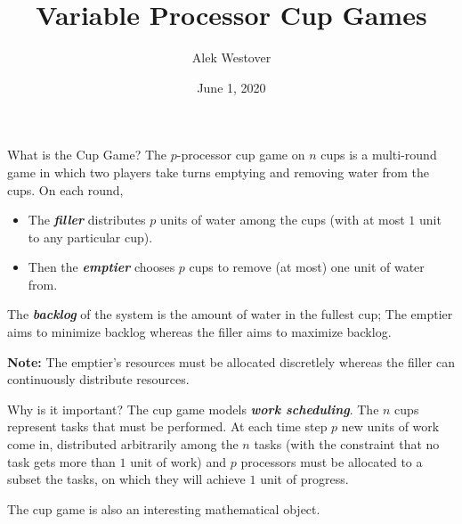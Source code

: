 \documentclass[xcolor=x11names, svgnames, rgb]{beamer}
\title{Variable Processor Cup Games}
\author{Alek Westover}
\institute{Belmont High School}
\date{June 1, 2020}
\newcommand{\defn}[1]       {{\textit{\textbf{\boldmath #1}}}}
\begin{document}
 
\frame{\titlepage}

\begin{frame}[t]{What is the Cup Game?}
  The $p$-processor cup game on $n$ cups is a multi-round game in which two
  players take turns emptying and removing water from the cups. On each round,
  \begin{itemize}
    \item The \defn{filler} distributes $p$ units of water among the cups (with at most $1$ unit to any particular cup). 
    \item Then the \defn{emptier} chooses $p$ cups to remove (at most) one unit of water from.
  \end{itemize}

  \vspace{0.4cm}

  The \defn{backlog} of the system is the amount of water in the fullest cup;
  The emptier aims to minimize backlog whereas the filler aims to maximize
  backlog.
  \vspace{0.4cm}

  \textbf{Note:} The emptier's resources must be allocated discretlely whereas
  the filler can continuously distribute resources.
\end{frame}

\begin{frame}[t]{Why is it important?}
  The cup game models \defn{work scheduling}. The $n$ cups represent tasks that
  must be performed. At each time step $p$ new units of work come in,
  distributed arbitrarily among the $n$ tasks (with the constraint that no task
  gets more than $1$ unit of work) and $p$ processors must be
  allocated to a subset the tasks, on which they will achieve $1$ unit of progress.

  \vspace{0.5cm}
  The cup game is also an interesting mathematical object.
\end{frame}
\end{document}
